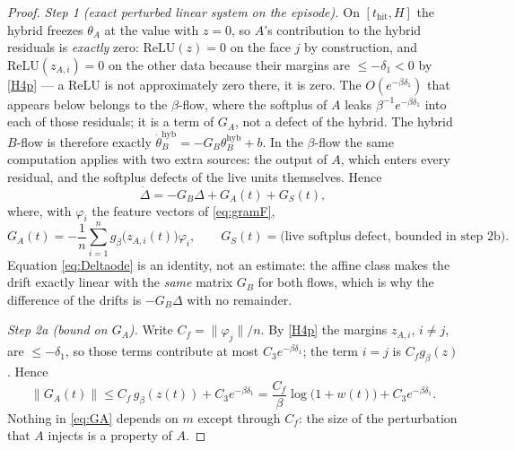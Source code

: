 \documentclass[11pt]{article}
\theoremstyle{definition}
\theoremstyle{remark}
\newcommand{\thit}{t_{\mathrm{hit}}}
\newcommand{\hyb}{\mathrm{hyb}}
\begin{document}
\begin{proof}
\emph{Step 1 (exact perturbed linear system on the episode).} On $[\thit,H]$ the
hybrid freezes $\theta_A$ at the value with $z=0$, so $A$'s contribution to the
hybrid residuals is \emph{exactly} zero: $\mathrm{ReLU}(z)=0$ on the face $j$ by
construction, and $\mathrm{ReLU}(z_{A,i})=0$ on the other data because their
margins are $\le-\delta_1<0$ by \eqref{H4p} --- a ReLU is not approximately zero
there, it is zero. The $O(e^{-\beta\delta_1})$ that appears below belongs to the
$\beta$-flow, where the softplus of $A$ leaks $\beta^{-1}e^{-\beta\delta_1}$
into each of those residuals; it is a term of $G_A$, not a defect of the hybrid.
The hybrid $B$-flow is therefore exactly
$\dot\theta_B^{\hyb}=-G_B\theta_B^{\hyb}+b$. In the $\beta$-flow the same
computation applies with two extra sources: the output of $A$, which enters
every residual, and the softplus defects of the live units themselves. Hence
\begin{equation}\label{eq:Deltaode}
\dot\Delta=-G_B\Delta+G_A(t)+G_S(t),
\end{equation}
where, with $\varphi_i$ the feature vectors of \eqref{eq:gramF},
\[
G_A(t)=-\frac1n\sum_{i=1}^n g_\beta\bigl(z_{A,i}(t)\bigr)\varphi_i,
\qquad
G_S(t)=\text{(live softplus defect, bounded in step 2b).}
\]
Equation \eqref{eq:Deltaode} is an identity, not an estimate: the affine class
makes the drift exactly linear with the \emph{same} matrix $G_B$ for both flows,
which is why the difference of the drifts is $-G_B\Delta$ with no remainder.

\emph{Step 2a (bound on $G_A$).} Write $C_f=\|\varphi_j\|/n$. By \eqref{H4p} the
margins $z_{A,i}$, $i\ne j$, are $\le-\delta_1$, so those terms contribute at
most $C_3e^{-\beta\delta_1}$; the term $i=j$ is $C_fg_\beta(z)$. Hence
\begin{equation}\label{eq:GA}
\|G_A(t)\|\le C_f\,g_\beta(z(t))+C_3e^{-\beta\delta_1}
=\frac{C_f}{\beta}\log\bigl(1+w(t)\bigr)+C_3e^{-\beta\delta_1}.
\end{equation}
Nothing in \eqref{eq:GA} depends on $m$ except through $C_f$: the size of the
perturbation that $A$ injects is a property of $A$.


\end{proof}
\end{document}
